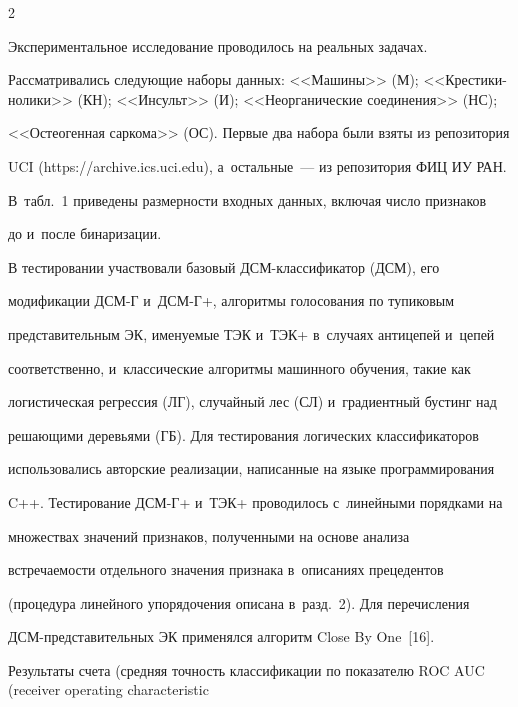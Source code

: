 \begin{multicols}{2}
\vspace*{-3pt}





  Экспериментальное исследование проводилось на реальных задачах. 


Рассматривались следующие наборы данных: <<Машины>> (М); <<Крес\-ти\-ки-но\-ли\-ки>> (КН); <<Инсульт>> (И); <<Неорганические соединения>> (НС); 


<<Остеогенная саркома>> (ОС). Первые два набора были взяты из репозитория 


UCI ({\sf https://archive.ics.uci.edu}), а~остальные~--- из репозитория ФИЦ ИУ РАН. 


В~табл.~1 приведены размерности входных данных, включая число признаков 


до и~после бинаризации. 


  








  В тестировании участ\-во\-ва\-ли базовый ДСМ-клас\-си\-фи\-ка\-тор (ДСМ), его 


модификации \mbox{ДСМ-Г} и~ДСМ-Г+, алгоритмы голосования по тупиковым 


представительным ЭК, именуемые ТЭК и~ТЭК+ в~случаях антицепей и~цепей 


соответственно, и~классические алгоритмы машинного обучения, такие как 


логистическая регрессия (ЛГ), случайный лес (СЛ) и~градиентный бустинг над 


ре\-ша\-ющи\-ми деревьями (ГБ). Для тестирования логических классификаторов 


использовались авторские реализации, написанные на языке программирования 


C++. Тестирование ДСМ-Г+ и~ТЭК+ проводилось с~линейными порядками на 


множествах значений признаков, полученными на основе анализа 


встречаемости отдельного значения признака в~описаниях прецедентов 


(процедура линейного упорядочения описана в~разд.~2). Для перечисления 


ДСМ-пред\-ста\-ви\-тель\-ных ЭК применялся алгоритм Close By One~[16]. 





  Результаты счета (средняя точность классификации по показателю ROC AUC (receiver operating characteristic



\end{multicols}
